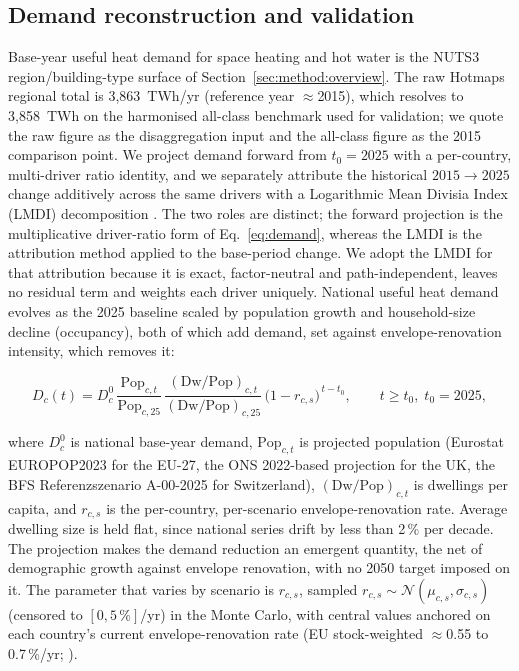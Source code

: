 \subsection{Demand reconstruction and validation}
\label{sec:method:demand}

Base-year useful heat demand for space heating and hot water is the NUTS3
region/building-type surface of Section~\ref{sec:method:overview}. The raw Hotmaps
regional total is 3{,}863~TWh/yr (reference year $\approx$2015), which
resolves to 3{,}858~TWh on the harmonised all-class benchmark used for validation;
we quote the raw figure as the disaggregation input and the all-class figure as the
2015 comparison point. We project demand forward from $t_0 = 2025$ with a
per-country, multi-driver ratio identity, and we separately attribute the historical
$2015\to2025$ change additively across the same drivers with a Logarithmic Mean
Divisia Index (LMDI) decomposition \citep{Ang2005}. The two roles are distinct; the
forward projection is the multiplicative driver-ratio form of Eq.~\eqref{eq:demand},
whereas the LMDI is the attribution method applied to the base-period change. We
adopt the LMDI for that attribution because it is exact, factor-neutral and
path-independent, leaves no residual term and weights each driver uniquely.
National useful heat demand evolves as the
2025 baseline scaled by population growth and household-size decline (occupancy),
both of which add demand, set against envelope-renovation intensity, which removes
it:

\begin{equation}
 D_c(t) = D_c^{0}\,
 \frac{\text{Pop}_{c,t}}{\text{Pop}_{c,25}}\,
 \frac{(\text{Dw}/\text{Pop})_{c,t}}{(\text{Dw}/\text{Pop})_{c,25}}\,
 \bigl(1-r_{c,s}\bigr)^{\,t-t_0},
 \qquad t \ge t_0,\; t_0 = 2025,
 \label{eq:demand}
\end{equation}

\noindent where $D_c^{0}$ is national base-year demand, $\text{Pop}_{c,t}$ is
projected population (Eurostat EUROPOP2023 for the EU-27, the ONS 2022-based
projection for the UK, the BFS Referenzszenario A-00-2025 for Switzerland),
$(\text{Dw}/\text{Pop})_{c,t}$ is dwellings per capita, and $r_{c,s}$ is the
per-country, per-scenario envelope-renovation rate. Average dwelling
size is held flat, since national series drift by less than 2\,\% per decade. The
projection makes the demand reduction an emergent quantity, the net of demographic growth against envelope renovation, with no 2050 target imposed on it.
The parameter that varies by scenario is $r_{c,s}$, sampled
$r_{c,s}\sim\mathcal{N}(\mu_{c,s},\sigma_{c,s})$ (censored to $[0,5\,\%]$/yr)
in the Monte Carlo, with central values anchored on each country's current
envelope-renovation rate (EU stock-weighted $\approx$0.55 to
0.7\,\%/yr; \citealp{BPIE2024Tracker,Esser2019renovation}).

